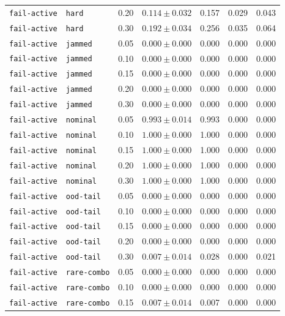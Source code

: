 \documentclass{article}
\begin{document}
\begin{center}
\begin{tabular}{lllcccc}
\texttt{fail-active} & \texttt{hard} & 0.20 & $0.114 \pm 0.032$ & 0.157 & 0.029 & 0.043 \\
\texttt{fail-active} & \texttt{hard} & 0.30 & $0.192 \pm 0.034$ & 0.256 & 0.035 & 0.064 \\
\texttt{fail-active} & \texttt{jammed} & 0.05 & $0.000 \pm 0.000$ & 0.000 & 0.000 & 0.000 \\
\texttt{fail-active} & \texttt{jammed} & 0.10 & $0.000 \pm 0.000$ & 0.000 & 0.000 & 0.000 \\
\texttt{fail-active} & \texttt{jammed} & 0.15 & $0.000 \pm 0.000$ & 0.000 & 0.000 & 0.000 \\
\texttt{fail-active} & \texttt{jammed} & 0.20 & $0.000 \pm 0.000$ & 0.000 & 0.000 & 0.000 \\
\texttt{fail-active} & \texttt{jammed} & 0.30 & $0.000 \pm 0.000$ & 0.000 & 0.000 & 0.000 \\
\texttt{fail-active} & \texttt{nominal} & 0.05 & $0.993 \pm 0.014$ & 0.993 & 0.000 & 0.000 \\
\texttt{fail-active} & \texttt{nominal} & 0.10 & $1.000 \pm 0.000$ & 1.000 & 0.000 & 0.000 \\
\texttt{fail-active} & \texttt{nominal} & 0.15 & $1.000 \pm 0.000$ & 1.000 & 0.000 & 0.000 \\
\texttt{fail-active} & \texttt{nominal} & 0.20 & $1.000 \pm 0.000$ & 1.000 & 0.000 & 0.000 \\
\texttt{fail-active} & \texttt{nominal} & 0.30 & $1.000 \pm 0.000$ & 1.000 & 0.000 & 0.000 \\
\texttt{fail-active} & \texttt{ood-tail} & 0.05 & $0.000 \pm 0.000$ & 0.000 & 0.000 & 0.000 \\
\texttt{fail-active} & \texttt{ood-tail} & 0.10 & $0.000 \pm 0.000$ & 0.000 & 0.000 & 0.000 \\
\texttt{fail-active} & \texttt{ood-tail} & 0.15 & $0.000 \pm 0.000$ & 0.000 & 0.000 & 0.000 \\
\texttt{fail-active} & \texttt{ood-tail} & 0.20 & $0.000 \pm 0.000$ & 0.000 & 0.000 & 0.000 \\
\texttt{fail-active} & \texttt{ood-tail} & 0.30 & $0.007 \pm 0.014$ & 0.028 & 0.000 & 0.021 \\
\texttt{fail-active} & \texttt{rare-combo} & 0.05 & $0.000 \pm 0.000$ & 0.000 & 0.000 & 0.000 \\
\texttt{fail-active} & \texttt{rare-combo} & 0.10 & $0.000 \pm 0.000$ & 0.000 & 0.000 & 0.000 \\
\texttt{fail-active} & \texttt{rare-combo} & 0.15 & $0.007 \pm 0.014$ & 0.007 & 0.000 & 0.000 \\

\end{tabular}
\end{center}
\end{document}
